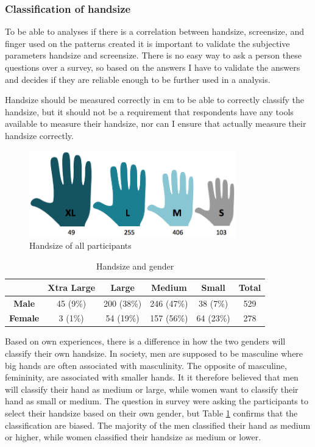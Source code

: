     \subsubsection*{Classification of handsize}
    To be able to analyses if there is a correlation between handsize, screensize, and finger used on the patterns created it is important to validate the subjective parameters handsize and screensize. There is no easy way to ask a person these questions over a survey, so based on the answers I have to validate the answers and decides if they are reliable enough to be further used in a analysis. 

    Handsize should be measured correctly in cm to be able to correctly classify the handsize, but it should not be a requirement that respondents have any tools available to measure their handsize, nor can I ensure that actually measure their handsize correctly. 


		\begin{figure}[H]
      \centering
      \includegraphics[width=0.8\textwidth]{pics/analysis/handsize.png}
      \caption{Handsize of all participants}
      \label{fig:handsize}
    \end{figure}

    \begin{table}[H]
      \centering
      \begin{tabular}{ c || c | c | c | c || c }
        \hline
        & {\bf Xtra Large} & {\bf Large} & {\bf Medium} & {\bf Small} & {\bf Total}\\ \hline
        {\bf Male} & 45 (9\%) & 200 (38\%) & 246 (47\%) & 38 (7\%) & 529 \\
        {\bf Female} & 3 (1\%) & 54 (19\%) & 157 (56\%) & 64 (23\%) & 278 \\ \hline
      \end{tabular}
      \caption{Handsize and gender}
      \label{tab:HandsizeGender}
    \end{table}

    Based on own experiences, there is a difference in how the two genders will classify their own handsize. In society, men are supposed to be masculine where big hands are often associated with masculinity. The opposite of masculine, femininity, are associated with smaller hands. It it therefore believed that men will classify their hand as medium or large, while women want to classify their hand as small or medium. The question in survey were asking the participants to select their handsize based on their own gender, but Table \ref{tab:HandsizeGender} confirms that the classification are biased. The majority of the men classified their hand as medium or higher, while women classified their handsize as medium or lower. 

